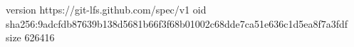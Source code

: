 version https://git-lfs.github.com/spec/v1
oid sha256:9adcfdb87639b138d5681b66f3f68b01002c68dde7ca51e636c1d5ea8f7a3fdf
size 626416
